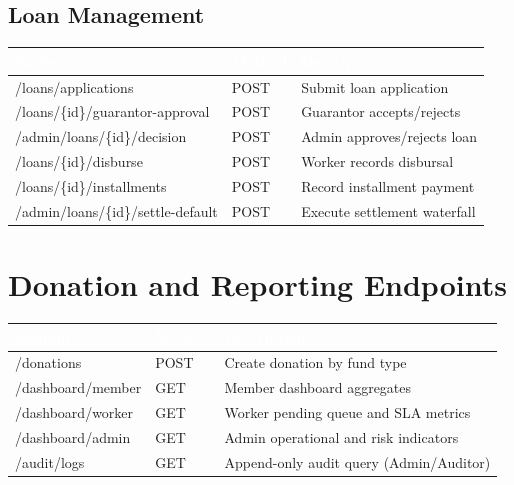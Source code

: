 \documentclass[11pt,a4paper]{article}
\begin{document}
\subsection{Loan Management}

\begin{longtable}{@{}>{\ttfamily}p{}p{}p{}@{}}
\toprule
\rowcolor{primaryblue}
\textcolor{white}{\normalfont\textbf{Endpoint}} & \textcolor{white}{\textbf{Method}} & \textcolor{white}{\textbf{Description}} \\
\midrule
\endhead
/loans/applications & POST & Submit loan application \\
\midrule
/loans/\{id\}/guarantor-approval & POST & Guarantor accepts/rejects \\
\midrule
/admin/loans/\{id\}/decision & POST & Admin approves/rejects loan \\
\midrule
/loans/\{id\}/disburse & POST & Worker records disbursal \\
\midrule
/loans/\{id\}/installments & POST & Record installment payment \\
\midrule
/admin/loans/\{id\}/settle-default & POST & Execute settlement waterfall \\
\bottomrule
\end{longtable}

\section{Donation and Reporting Endpoints}

\begin{longtable}{@{}>{\ttfamily}p{}p{}p{}@{}}
\toprule
\rowcolor{primaryblue}
\textcolor{white}{\normalfont\textbf{Endpoint}} & \textcolor{white}{\textbf{Method}} & \textcolor{white}{\textbf{Description}} \\
\midrule
\endhead
/donations & POST & Create donation by fund type \\
\midrule
/dashboard/member & GET & Member dashboard aggregates \\
\midrule
/dashboard/worker & GET & Worker pending queue and SLA metrics \\
\midrule
/dashboard/admin & GET & Admin operational and risk indicators \\
\midrule
/audit/logs & GET & Append-only audit query (Admin/Auditor) \\
\bottomrule
\end{longtable}
\end{document}
